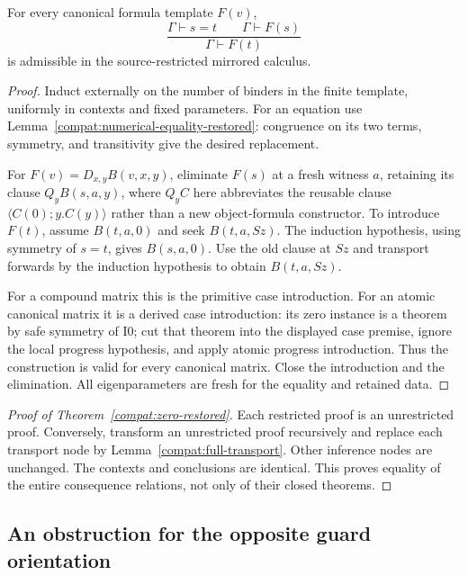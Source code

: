 \begin{lemma}
\label{compat:full-transport}
For every canonical formula template $F(v)$,
\[
 \frac{\Gamma\vdash s=t\qquad\Gamma\vdash F(s)}
      {\Gamma\vdash F(t)}
\]
is admissible in the source-restricted mirrored calculus.
\end{lemma}
\begin{proof}
Induct externally on the number of binders in the finite template,
uniformly in contexts and fixed parameters. For an equation use
Lemma~\ref{compat:numerical-equality-restored}: congruence on its two
terms, symmetry, and transitivity give the desired replacement.

For $F(v)=D_{x,y}B(v,x,y)$, eliminate $F(s)$ at a fresh witness $a$,
retaining its clause $Q_yB(s,a,y)$, where $Q_yC$ here abbreviates
the reusable clause $\langle C(0);y.C(y)\rangle$ rather than a new
object-formula constructor. To introduce $F(t)$, assume
$B(t,a,0)$ and seek $B(t,a,Sz)$. The induction hypothesis, using
symmetry of $s=t$, gives $B(s,a,0)$. Use the old clause at $Sz$ and
transport forwards by the induction hypothesis to obtain
$B(t,a,Sz)$.

For a compound matrix this is the primitive case introduction.
For an atomic canonical matrix it is a derived case introduction:
its zero instance is a theorem by safe symmetry of I0; cut that theorem
into the displayed case premise, ignore the local progress hypothesis,
and apply atomic progress introduction. Thus the construction is valid
for every canonical matrix. Close the introduction and the elimination.
All eigenparameters are fresh for the equality and retained data.
\end{proof}

\begin{proof}[Proof of Theorem~\ref{compat:zero-restored}]
Each restricted proof is an unrestricted proof. Conversely, transform an
unrestricted proof recursively and replace each transport node by
Lemma~\ref{compat:full-transport}. Other inference nodes are unchanged.
The contexts and conclusions are identical. This proves equality of
the entire consequence relations, not only of their closed theorems.
\end{proof}

\subsection{An obstruction for the opposite guard orientation}
\label{compat:left-guard-obstruction}


